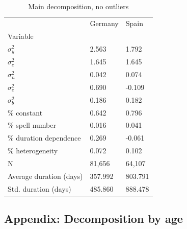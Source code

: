 \documentclass[12pt]{article}
\theoremstyle{definition}
\theoremstyle{remark}
\begin{document}
\begin{appendices}
\begin{table}[httb!]
    \centering
    \caption{Main decomposition, no outliers}
\begin{tabular}{lll}
\toprule
 & Germany & Spain \\
Variable &  &  \\
\midrule
$\sigma^{2}_y$ & 2.563 & 1.792 \\
$\sigma^{2}_c$ & 1.645 & 1.645 \\
$\sigma^{2}_n$ & 0.042 & 0.074 \\
$\sigma^{2}_e$ & 0.690 & -0.109 \\
$\sigma^{2}_b$ & 0.186 & 0.182 \\
\midrule
\% constant & 0.642 & 0.796 \\
\% spell number & 0.016 & 0.041 \\
\% duration dependence & 0.269 & -0.061 \\
\% heterogeneity & 0.072 & 0.102 \\
\hline \hline
N & 81,656 & 64,107 \\
Average duration (days) & 357.992 & 803.791 \\
Std. duration (days) & 485.860 & 888.478 \\
\bottomrule
\end{tabular}

\end{table}

\clearpage

\subsection{Appendix: Decomposition by age}



\end{appendices}
\end{document}
